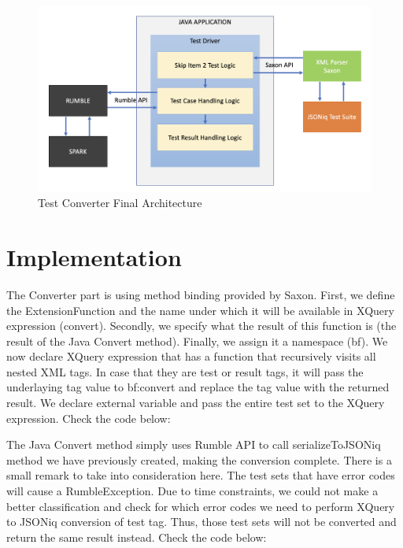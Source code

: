 \begin{figure}[h!]
	\vspace*{-5mm}
	\includegraphics[width=\linewidth]{test_driver_final_architecture.png}
	\vspace*{-8mm}
	\caption{Test Converter Final Architecture}
	\label{fig:test_driver_final_architecture.png}
\end{figure}

\section{Implementation}
The Converter part is using method binding provided by Saxon. First, we define the ExtensionFunction and the name under which it will be available in XQuery expression (convert). Secondly, we specify what the result of this function is (the result of the Java Convert method). Finally, we assign it a namespace (bf). We now declare XQuery expression that has a function that recursively visits all nested XML tags. In case that they are test or result tags, it will pass the underlaying tag value to bf:convert and replace the tag value with the returned result. We declare external variable and pass the entire test set to the XQuery expression. Check the code below:



The Java Convert method simply uses Rumble API to call serializeToJSONiq method we have previously created, making the conversion complete. There is a small remark to take into consideration here. The test sets that have error codes will cause a RumbleException. Due to time constraints, we could not make a better classification and check for which error codes we need to perform XQuery to JSONiq conversion of test tag. Thus, those test sets will not be converted and return the same result instead. Check the code below:

